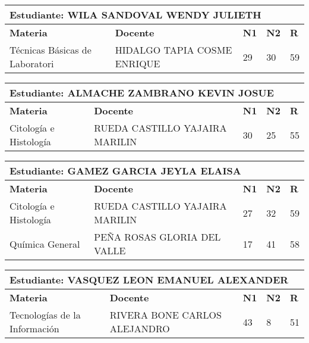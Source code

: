 \small
\begin{tabularx}{\textwidth}{|p{5cm}|p{7cm}|X|X|X|}
\hline
\multicolumn{5}{|p{\dimexpr\textwidth-2\tabcolsep-2\arrayrulewidth}|}{\textbf{Estudiante: WILA SANDOVAL WENDY JULIETH }}\\\hline
\textbf{Materia} & \textbf{Docente} & \textbf{N1} & \textbf{N2} & \textbf{R} \\ \hline
Técnicas Básicas de Laboratori & HIDALGO TAPIA COSME ENRIQUE  & 29 & 30& 59 \\ \hline
\end{tabularx}\vspace{10mm}
\small
\begin{tabularx}{\textwidth}{|p{5cm}|p{7cm}|X|X|X|}
\hline
\multicolumn{5}{|p{\dimexpr\textwidth-2\tabcolsep-2\arrayrulewidth}|}{\textbf{Estudiante: ALMACHE ZAMBRANO KEVIN JOSUE }}\\\hline
\textbf{Materia} & \textbf{Docente} & \textbf{N1} & \textbf{N2} & \textbf{R} \\ \hline
Citología e Histología & RUEDA CASTILLO YAJAIRA MARILIN  & 30 & 25& 55 \\ \hline
\end{tabularx}\vspace{10mm}
\small
\begin{tabularx}{\textwidth}{|p{5cm}|p{7cm}|X|X|X|}
\hline
\multicolumn{5}{|p{\dimexpr\textwidth-2\tabcolsep-2\arrayrulewidth}|}{\textbf{Estudiante: GAMEZ GARCIA JEYLA ELAISA }}\\\hline
\textbf{Materia} & \textbf{Docente} & \textbf{N1} & \textbf{N2} & \textbf{R} \\ \hline
Citología e Histología & RUEDA CASTILLO YAJAIRA MARILIN  & 27 & 32& 59 \\ \hline
Química General & PEÑA ROSAS GLORIA DEL VALLE  & 17 & 41& 58 \\ \hline
\end{tabularx}\vspace{10mm}
\small
\begin{tabularx}{\textwidth}{|p{5cm}|p{7cm}|X|X|X|}
\hline
\multicolumn{5}{|p{\dimexpr\textwidth-2\tabcolsep-2\arrayrulewidth}|}{\textbf{Estudiante: VASQUEZ LEON EMANUEL ALEXANDER }}\\\hline
\textbf{Materia} & \textbf{Docente} & \textbf{N1} & \textbf{N2} & \textbf{R} \\ \hline
Tecnologías de la Información  & RIVERA BONE CARLOS ALEJANDRO  & 43 & 8& 51 \\ \hline
\end{tabularx}\vspace{10mm}
